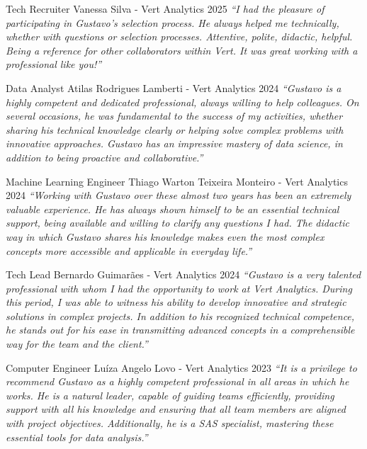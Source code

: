 \begin{cventries}
  \cventry
    {Tech Recruiter} %
    {Vanessa Silva - Vert Analytics} %
    {2025} %
    {} %
    {
      \textit{``I had the pleasure of participating in Gustavo's selection process. He always helped me technically, whether with questions or selection processes. Attentive, polite, didactic, helpful. Being a reference for other collaborators within Vert. It was great working with a professional like you!''}
    }

  \cventry
    {Data Analyst} %
    {Atilas Rodrigues Lamberti - Vert Analytics} %
    {2024} %
    {} %
    {
      \textit{``Gustavo is a highly competent and dedicated professional, always willing to help colleagues. On several occasions, he was fundamental to the success of my activities, whether sharing his technical knowledge clearly or helping solve complex problems with innovative approaches. Gustavo has an impressive mastery of data science, in addition to being proactive and collaborative.''}
    }

  \cventry
    {Machine Learning Engineer} %
    {Thiago Warton Teixeira Monteiro - Vert Analytics} %
    {2024} %
    {} %
    {
      \textit{``Working with Gustavo over these almost two years has been an extremely valuable experience. He has always shown himself to be an essential technical support, being available and willing to clarify any questions I had. The didactic way in which Gustavo shares his knowledge makes even the most complex concepts more accessible and applicable in everyday life.''}
    }

  \cventry
    {Tech Lead} %
    {Bernardo Guimarães - Vert Analytics} %
    {2024} %
    {} %
    {
      \textit{``Gustavo is a very talented professional with whom I had the opportunity to work at Vert Analytics. During this period, I was able to witness his ability to develop innovative and strategic solutions in complex projects. In addition to his recognized technical competence, he stands out for his ease in transmitting advanced concepts in a comprehensible way for the team and the client.''}
    }

  \cventry
    {Computer Engineer} %
    {Luíza Angelo Lovo - Vert Analytics} %
    {2023} %
    {} %
    {
      \textit{``It is a privilege to recommend Gustavo as a highly competent professional in all areas in which he works. He is a natural leader, capable of guiding teams efficiently, providing support with all his knowledge and ensuring that all team members are aligned with project objectives. Additionally, he is a SAS specialist, mastering these essential tools for data analysis.''}
    }


\end{cventries}
